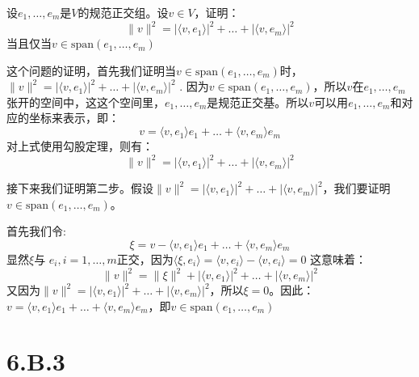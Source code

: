 \documentclass[10pt,a4paper,UTF8]{article}
\begin{document}
\begin{tikzproblem}
设\(e_{1},\ldots ,e_{m}\)是\(V\)的规范正交组。设\(v\in V\)，证明：
\begin{equation}
\label{eq:2}
\| v \|^{2} = | \langle v,e_{1} \rangle  |^{2} + \ldots + | \langle v,e_{m} \rangle  |^{2}
\end{equation}
当且仅当\(v\in \mathrm{span}(e_{1},\ldots ,e_{m})\)
\end{tikzproblem}

\begin{tikzanswer}
这个问题的证明，首先我们证明当\(v\in \mathrm{span}(e_{1},\ldots ,e_{m})\)时，\(\| v \|^{2} = | \langle v,e_{1} \rangle  |^{2} + \ldots + | \langle v,e_{m} \rangle  |^{2}\) .
因为\(v\in \mathrm{span}(e_{1},\ldots ,e_{m})\)，所以\(v\)在\(e_{1},\ldots ,e_{m}\)张开的空间中，这这个空间里，\(e_{1},\ldots ,e_{m}\)是规范正交基。所以\(v\)可以用\(e_{1},\ldots ,e_{m}\)和对应的坐标来表示，即：
\begin{equation}
\label{eq:3}
v = \langle v,e_{1} \rangle e_{1} + \ldots + \langle v,e_{m} \rangle e_{m}
\end{equation}
对上式使用勾股定理，则有：
\begin{equation}
\label{eq:4}
\| v \|^{2} = | \langle v,e_{1} \rangle  |^{2} + \ldots + | \langle v,e_{m} \rangle  |^{2}
\end{equation}

接下来我们证明第二步。假设\(\| v \|^{2} = | \langle v,e_{1} \rangle  |^{2} + \ldots + | \langle v,e_{m} \rangle  |^{2}\)，我们要证明\(v\in \mathrm{span}(e_{1},\ldots ,e_{m})\)。

首先我们令:
\begin{equation}
\label{eq:5}
\xi = v - \langle v,e_{1} \rangle e_{1} + \ldots + \langle v,e_{m} \rangle e_{m}
\end{equation}
显然\(\xi\)与 \(e_{i},i=1,\ldots ,m\)正交，因为\(\langle \xi,e_{i} \rangle  = \langle v,e_{i} \rangle  - \langle v,e_{i} \rangle  =0\)
这意味着：
\begin{equation}
\label{eq:6}
\| v \|^{2} =  \| \xi \|^{2} + | \langle v,e_{1} \rangle  |^{2} + \ldots + | \langle v,e_{m} \rangle  |^{2}
\end{equation}
又因为\(\| v \|^{2} = | \langle v,e_{1} \rangle  |^{2} + \ldots + | \langle v,e_{m} \rangle  |^{2}\)，所以\(\xi = 0\)。因此：\(v = \langle v,e_{1} \rangle e_{1} + \ldots + \langle v,e_{m} \rangle e_{m}\)，即\(v\in \mathrm{span}(e_{1},\ldots ,e_{m})\)
\end{tikzanswer}
\section{6.B.3}
\label{sec:org5d44523}
\end{document}
